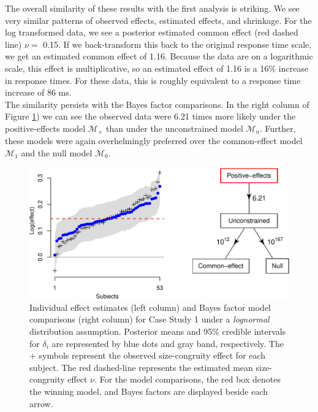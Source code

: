 \documentclass[12pt,twoside,a4paper]{article}
\begin{document}
The overall similarity of these results with the first analysis is striking. We see very similar patterns of observed effects, estimated effects, and shrinkage. For the log transformed data, we see a posterior estimated common effect (red dashed line) \(\nu=\) 0.15. If we back-transform this back to the original response time scale, we get an estimated common effect of 1.16. Because the data are on a logarithmic scale, this effect is multiplicative, so an estimated effect of 1.16 is a 16\% increase in response times. For these data, this is roughly equivalent to a response time increase of 86 ms.\\

The similarity persists with the Bayes factor comparisons. In the right column of Figure \ref{fig:plot1log}) we can see the observed data were 6.21 times more likely under the positive-effects model \(\mathcal{M}_+\) than under the unconstrained model \(\mathcal{M}_u\). Further, these models were again overhelmingly preferred over the common-effect model \(\mathcal{M}_1\) and the null model \(\mathcal{M}_0\).\\

\begin{figure}[htbp]
\centering
\includegraphics[width=\textwidth]{plot1log-1.pdf}
\caption{\label{fig:plot1log}Individual effect estimates (left column) and Bayes factor model comparisons (right column) for Case Study 1 under a \emph{lognormal} distribution assumption. Posterior means and 95\% credible intervals for \(\delta_i\) are represented by blue dots and gray band, respectively. The + symbols represent the observed size-congruity effect for each subject. The red dashed-line represents the estimated mean size-congruity effect \(\nu\). For the model comparisons, the red box denotes the winning model, and Bayes factors are displayed beside each arrow.}
\end{figure}
\end{document}
